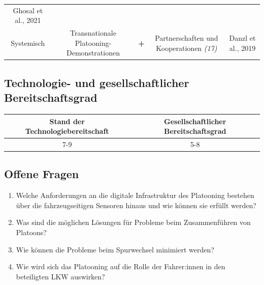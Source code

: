 \documentclass[
]{book}
\providecommand{\tightlist}{%
  \setlength{\itemsep}{0pt}\setlength{\parskip}{0pt}}
\begin{document}
\begin{longtable}[]{@{}ccccc@{}}
\begin{minipage}[t]{0.17\columnwidth}
Ghosal et al., 2021\strut
\end{minipage}\tabularnewline
\begin{minipage}[t]{0.17\columnwidth}\centering
Systemisch\strut
\end{minipage} & \begin{minipage}[t]{0.16\columnwidth}\centering
Transnationale Platooning-Demonstrationen\strut
\end{minipage} & \begin{minipage}[t]{0.17\columnwidth}\centering
\textbf{+}\strut
\end{minipage} & \begin{minipage}[t]{0.17\columnwidth}\centering
Partnerschaften und Kooperationen \emph{(17)}\strut
\end{minipage} & \begin{minipage}[t]{0.17\columnwidth}\centering
Danzl et al., 2019\strut
\end{minipage}\tabularnewline
\bottomrule
\end{longtable}

\hypertarget{technologie--und-gesellschaftlicher-bereitschaftsgrad-8}{%
\subsection*{Technologie- und gesellschaftlicher Bereitschaftsgrad}\label{technologie--und-gesellschaftlicher-bereitschaftsgrad-8}}

\begin{longtable}[]{@{}cc@{}}
\toprule
Stand der Technologiebereitschaft & Gesellschaftlicher Bereitschaftsgrad\tabularnewline
\midrule
\endhead
7-9 & 5-8\tabularnewline
\bottomrule
\end{longtable}

\hypertarget{offene-fragen-10}{%
\subsection*{Offene Fragen}\label{offene-fragen-10}}

\begin{enumerate}
\def\labelenumi{\arabic{enumi}.}
\tightlist
\item
  Welche Anforderungen an die digitale Infrastruktur des Platooning bestehen über die fahrzeugseitigen Sensoren hinaus und wie können sie erfüllt werden?
\item
  Was sind die möglichen Lösungen für Probleme beim Zusammenführen von Platoons?
\item
  Wie können die Probleme beim Spurwechsel minimiert werden?
\item
  Wie wird sich das Platooning auf die Rolle der Fahrer:innen in den beteiligten LKW auswirken?
\end{enumerate}
\end{document}
